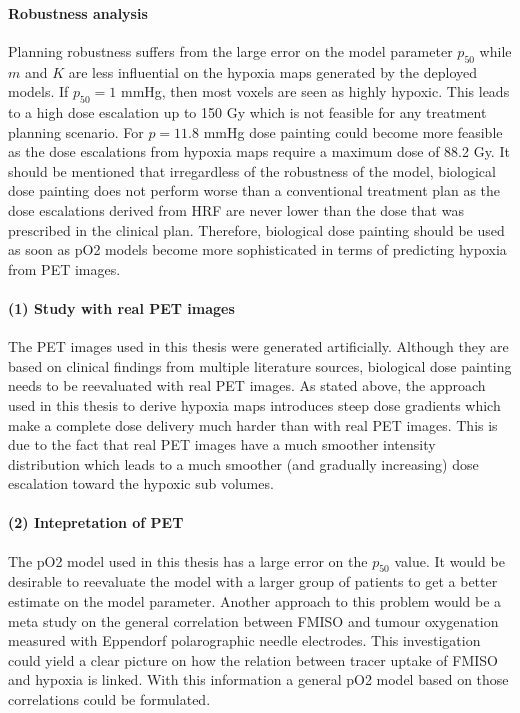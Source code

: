 \paragraph{Robustness analysis} Planning robustness suffers from the large error on the model parameter $p_{50}$ while $m$ and $K$ are less influential on the hypoxia maps generated by the deployed models. If $p_{50} = 1$ mmHg, then most voxels are seen as highly hypoxic. This leads to a high dose escalation up to 150 Gy which is not feasible for any treatment planning scenario. For $p=11.8$ mmHg dose painting could become more feasible as the dose escalations from hypoxia maps require a maximum dose of 88.2 Gy. It should be mentioned that irregardless of the robustness of the model, biological dose painting does not perform worse than a conventional treatment plan as the dose escalations derived from HRF are never lower than the dose that was prescribed in the clinical plan. Therefore, biological dose painting should be used as soon as pO2 models become more sophisticated in terms of predicting hypoxia from PET images.
\paragraph{(1) Study with real PET images} The PET images used in this thesis were generated artificially. Although they are based on clinical findings from multiple literature sources, biological dose painting needs to be reevaluated with real PET images. As stated above, the approach used in this thesis to derive hypoxia maps introduces steep dose gradients which make a complete dose delivery much harder than with real PET images. This is due to the fact that real PET images have a much smoother intensity distribution which leads to a much smoother (and gradually increasing) dose escalation toward the hypoxic sub volumes.
\paragraph{(2) Intepretation of PET} The pO2 model used in this thesis has a large error on the $p_{50}$ value. It would be desirable to reevaluate the model with a larger group of patients to get a better estimate on the model parameter. Another approach to this problem would be a meta study on the general correlation between FMISO and tumour oxygenation measured with Eppendorf polarographic needle electrodes. This investigation could yield a clear picture on how the relation between tracer uptake of FMISO and hypoxia is linked. With this information a general pO2 model based on those correlations could be formulated.

